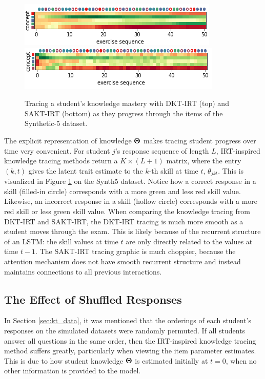\begin{figure}[h]
  \centering
  \includegraphics[width=.7\textwidth]{img/kt_irt/knowledge_trace_lstm_edited.png}\\
  \vspace{.5cm}
  \includegraphics[width=.7\textwidth]{img/kt_irt/knowledge_trace_attn_edited.png}
  \caption{Tracing a student's knowledge mastery with DKT-IRT (top) and SAKT-IRT (bottom) as they progress through the items of the Synthetic-5 dataset.}
  \label{fig:synth5_trace}
\end{figure}

The explicit representation of knowledge $\boldsymbol{\Theta}$ makes tracing student progress over time very convenient. For student $j$'s response sequence of length $L$, IRT-inspired knowledge tracing methods return a $K \times (L+1)$ matrix, where the entry $(k,t)$ gives the latent trait estimate to the $k$-th skill at time $t$, $\theta_{jkt}$. This is visualized in Figure \ref{fig:synth5_trace} on the Synth5 dataset. Notice how a correct response in a skill (filled-in circle) corresponds with a more green and less red skill value. Likewise, an incorrect response in a skill (hollow circle) corresponds with a more red skill or less green skill value. When comparing the knowledge tracing from DKT-IRT and SAKT-IRT, the DKT-IRT tracing is much more smooth as a student moves through the exam. This is likely because of the recurrent structure of an LSTM: the skill values at time $t$ are only directly related to the values at time $t-1$. The SAKT-IRT tracing graphic is much choppier, because the attention mechanism does not have smooth recurrent structure and instead maintains connections to all previous interactions.

\subsection{The Effect of Shuffled Responses}\label{sec:shuffle}
In Section \ref{sec:kt_data}, it was mentioned that the orderings of each student's responses on the simulated datasets were randomly permuted. If all students answer all questions in the same order, then the IRT-inspired knowledge tracing method suffers greatly, particularly when viewing the item parameter estimates. This is due to how student knowledge $\boldsymbol{\Theta}$ is estimated initially at $t=0$, when no other information is provided to the model.

